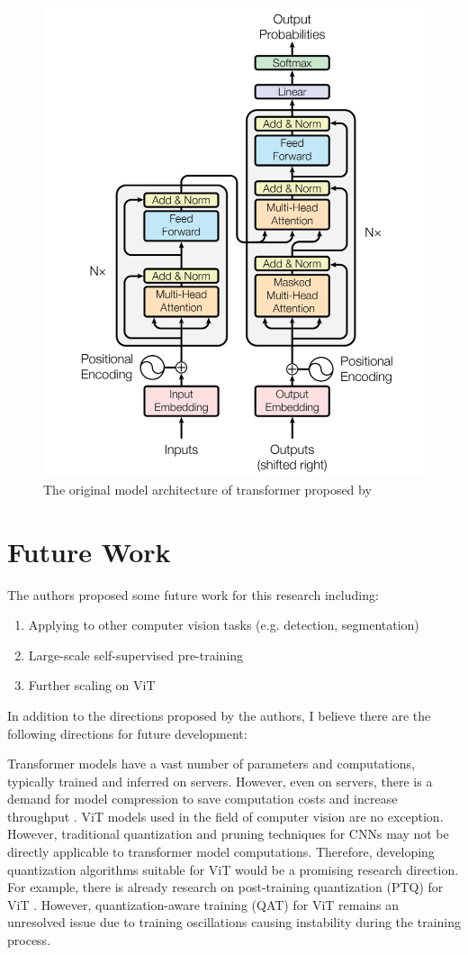 \documentclass[12pt]{article}
\begin{document}
\begin{figure}
    \centering
    \includegraphics[width=0.5\linewidth]{images/model_arch_orig.png}
    \caption{The original model architecture of transformer proposed by \cite{vaswani_attention_2023}}
    \label{fig:model_arch_orig}
\end{figure}




\section{Future Work}

The authors proposed some future work for this research including:

\begin{enumerate}
    \item Applying to other computer vision tasks (e.g. detection, segmentation)
    \item Large-scale self-supervised pre-training
    \item Further scaling on ViT
\end{enumerate}


In addition to the directions proposed by the authors, I believe there are the following directions for future development:

Transformer models have a vast number of parameters and computations, typically trained and inferred on servers. However, even on servers, there is a demand for model compression to save computation costs and increase throughput \cite{zhao_atom_2023}. ViT models used in the field of computer vision are no exception. However, traditional quantization and pruning techniques for CNNs may not be directly applicable to transformer model computations. Therefore, developing quantization algorithms suitable for ViT would be a promising research direction. For example, there is already research on post-training quantization (PTQ) for ViT \cite{liu_post-training_2021}. However, quantization-aware training (QAT) for ViT remains an unresolved issue due to training oscillations causing instability during the training process.
\end{document}
